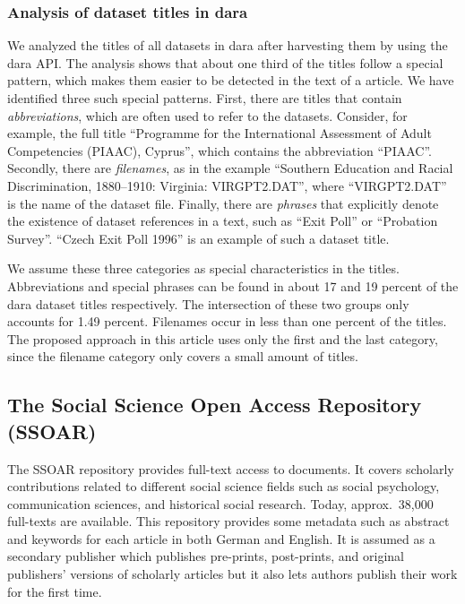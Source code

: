 \documentclass{IOS-Book-Article}
\newcommand{\dara}{\textsf{da\textbar ra}}
\begin{document}
  \subsubsection{Analysis of dataset titles in {\dara}}
  We analyzed the titles of all datasets in {\dara} after harvesting them by using the {\dara} API.
  The analysis shows that about one third of the titles follow a special pattern, which makes them easier to be detected in the text of a article.
  We have identified three such special patterns.
  First, there are titles that contain \emph{abbreviations}, which are often used to refer to the datasets. 
  Consider, for example, the full title \enquote{Programme for the International Assessment of Adult Competencies (PIAAC), Cyprus}, which contains the abbreviation \enquote{PIAAC}.
  Secondly, there are \emph{filenames}, as in the example \enquote{Southern Education and Racial Discrimination, 1880--1910: Virginia: VIRGPT2.DAT}, where \enquote{VIRGPT2.DAT} is the name of the dataset file.
  Finally, there are \emph{phrases} that explicitly denote the existence of 
  dataset references in a text, such as \enquote{Exit Poll} or \enquote{Probation Survey}.
  \enquote{Czech Exit Poll 1996} is an example of such a dataset title. 

  We assume these three categories as special characteristics in the titles.
  Abbreviations and special phrases can be found in about 17 and 19 percent of the {\dara} dataset titles respectively.
  The intersection of these two groups only accounts for 1.49 percent.
  Filenames occur in less than one percent of the titles. 
The proposed approach in this article uses only the first and the last category, since the filename category only covers a small amount of titles.

\subsection{The Social Science Open Access Repository (SSOAR)}
The SSOAR repository provides full-text access to documents.
It covers scholarly contributions related to different social science fields such as social psychology, communication sciences, and historical social research.
Today, approx.\ 38,000 full-texts are available.
This repository provides some metadata such as abstract and keywords for each article in both German and English.
It is assumed as a secondary publisher which publishes pre-prints, post-prints, and original publishers' versions of scholarly articles but it also lets authors publish their work for the first time.
\end{document}
